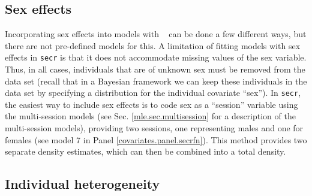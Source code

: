 \subsection{Sex effects}
\label{covariates.secr.sex}

Incorporating sex effects into
models with \secr~ can be done a few different ways, but there are not
pre-defined models for this.  A limitation of fitting models with sex
effects in \mbox{\tt secr} is that it does not accommodate missing
values of the sex variable. Thus, in all cases,
individuals that are of unknown sex must be removed from the data set
(recall that in a Bayesian framework we can keep these individuals in
the data set by specifying a distribution for the individual covariate
``sex'').
In \mbox{\tt secr}, the easiest way to include sex effects is 
to code sex as a  ``session'' variable using the multi-session models
(see Sec. \ref{mle.sec.multisession} for a description
of the multi-session models), providing two sessions, one representing
males and one for females (see model 7 in Panel
\ref{covariates.panel.secrfn}).  This method provides two separate
density estimates, which can then be combined into a total density.

\subsection{Individual heterogeneity}
\label{covariates.sec.secrH2}

